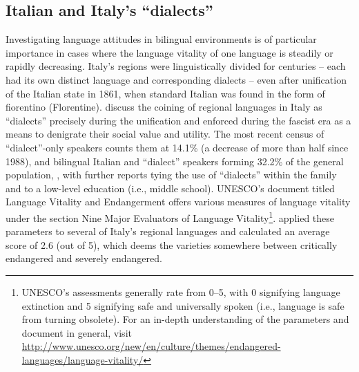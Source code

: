 \documentclass[output=paper,colorlinks,citecolor=brown]{langscibook}
\begin{document}
\subsection{Italian and Italy’s “dialects”}
\par Investigating language attitudes in bilingual environments is of particular importance in cases where the language vitality of one language is steadily or rapidly decreasing. Italy’s regions were linguistically divided for centuries – each had its own distinct language and corresponding dialects – even after unification of the Italian state in 1861, when standard Italian was found in the form of fiorentino (Florentine). \cite{akma17} discuss the coining of regional languages in Italy as “dialects” precisely during the unification and enforced during the fascist era as a means to denigrate their social value and utility. The most recent census of “dialect”-only speakers counts them at 14.1\% (a decrease of more than half since 1988), and bilingual Italian and “dialect” speakers forming 32.2\% of the general population, \citep{ista15}, with further reports tying the use of “dialects” within the family and to a low-level education (i.e., middle school). UNESCO’s document titled Language Vitality and Endangerment \citep{bren03} offers various measures of language vitality under the section Nine Major Evaluators of Language Vitality\footnote{UNESCO’s assessments generally rate from 0--5, with 0 signifying language extinction and 5 signifying safe and universally spoken (i.e., language is safe from turning obsolete). For an in-depth understanding of the parameters and document in general, visit \href{http://www.unesco.org/new/en/culture/themes/endangered-languages/language-vitality/}{http://www.unesco.org/new/en/culture/themes/endangered-languages/language-vitality/}}. \citep{colu09} applied these parameters to several of Italy’s regional languages and calculated an average score of 2.6 (out of 5), which deems the varieties somewhere between critically endangered and severely endangered.
\end{document}
